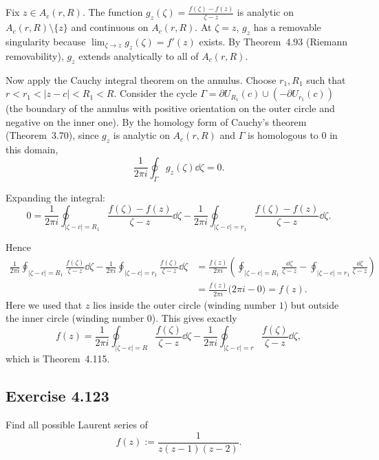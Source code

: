 \documentclass{article}
\begin{document}
\begin{solution}
  Fix $z \in A_c(r, R)$. The function $g_z(\zeta) = \frac{f(\zeta)-f(z)}{\zeta-z}$
  is analytic on $A_c(r, R) \setminus \{z\}$ and continuous on $A_c(r, R)$.
  At $\zeta = z$, $g_z$ has a removable singularity because
  $\lim_{\zeta \to z} g_z(\zeta) = f'(z)$ exists. By Theorem~4.93 (Riemann
  removability), $g_z$ extends analytically to all of $A_c(r, R)$.

  Now apply the Cauchy integral theorem on the annulus. Choose $r_1, R_1$ such
  that $r < r_1 < |z-c| < R_1 < R$. Consider the cycle
  $\Gamma = \partial U_{R_1}(c) \cup (-\partial U_{r_1}(c))$ (the boundary of
  the annulus with positive orientation on the outer circle and negative on the
  inner one). By the homology form of Cauchy's theorem (Theorem~3.70), since
  $g_z$ is analytic on $A_c(r, R)$ and $\Gamma$ is homologous to $0$ in this
  domain,
  \[
    \frac{1}{2\pi i} \oint_{\Gamma} g_z(\zeta) \dd \zeta = 0.
  \]

  Expanding the integral:
  \[
    0 = \frac{1}{2\pi i} \oint_{|\zeta-c|=R_1} \frac{f(\zeta)-f(z)}{\zeta-z} \dd\zeta
    - \frac{1}{2\pi i} \oint_{|\zeta-c|=r_1} \frac{f(\zeta)-f(z)}{\zeta-z} \dd\zeta.
  \]

  Hence
  \begin{align*}
    \frac{1}{2\pi i} \oint_{|\zeta-c|=R_1} \frac{f(\zeta)}{\zeta-z} \dd\zeta
    - \frac{1}{2\pi i} \oint_{|\zeta-c|=r_1} \frac{f(\zeta)}{\zeta-z} \dd\zeta
    &= \frac{f(z)}{2\pi i} \left(
      \oint_{|\zeta-c|=R_1} \frac{\dd\zeta}{\zeta-z}
      - \oint_{|\zeta-c|=r_1} \frac{\dd\zeta}{\zeta-z}
    \right)\\
    &= \frac{f(z)}{2\pi i} \bigl(2\pi i - 0\bigr) = f(z).
  \end{align*}
  Here we used that $z$ lies inside the outer circle (winding number $1$) but
  outside the inner circle (winding number $0$). This gives exactly
  \[
    f(z) = \frac{1}{2\pi i} \oint_{|\zeta-c|=R} \frac{f(\zeta)}{\zeta-z} \dd\zeta
    - \frac{1}{2\pi i} \oint_{|\zeta-c|=r} \frac{f(\zeta)}{\zeta-z} \dd\zeta,
  \]
  which is Theorem~4.115.
\end{solution}

\subsection{Exercise 4.123}

Find all possible Laurent series of
\[
  f(z) := \frac{1}{z(z-1)(z-2)}.
\]
\end{document}
